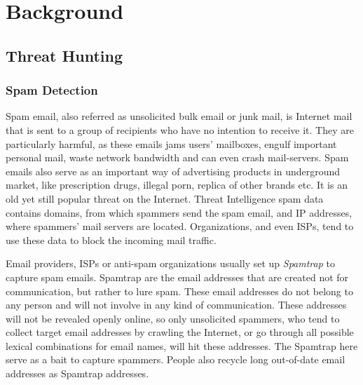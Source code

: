 \chapter{Background}
\label{chapter:background}

\section{Threat Hunting}



\subsection{Spam Detection}
Spam email, also referred as unsolicited bulk email or junk mail, is 
Internet mail that is sent to a group of recipients who have no intention 
to receive it. They are particularly harmful, as these emails jams users' 
mailboxes, engulf important personal mail, waste network bandwidth and 
can even crash mail-servers. Spam emails also serve as an important
way of advertising products in underground market, like prescription drugs, 
illegal porn, replica of other brands etc. It is an old yet still popular
threat on the Internet. Threat Intelligence spam data contains domains, 
from which spammers send the spam email, and IP addresses, where spammers' 
mail servers are located. Organizations, and even ISPs, tend to use these 
data to block the incoming mail traffic.

Email providers, ISPs or anti-spam organizations usually set up 
\textit{Spamtrap} to capture spam emails. Spamtrap are the email addresses
that are created not for communication, but rather to lure spam. These
email addresses do not belong to any person and will not involve in any
kind of communication. These addresses will not be revealed openly online,
so only unsolicited spammers, who tend to collect target email addresses
by crawling the Internet, or go through all possible lexical combinations
for email names, will hit these addresses. The Spamtrap here serve as a 
bait to capture spammers. People also recycle long out-of-date email 
addresses as Spamtrap addresses. 

